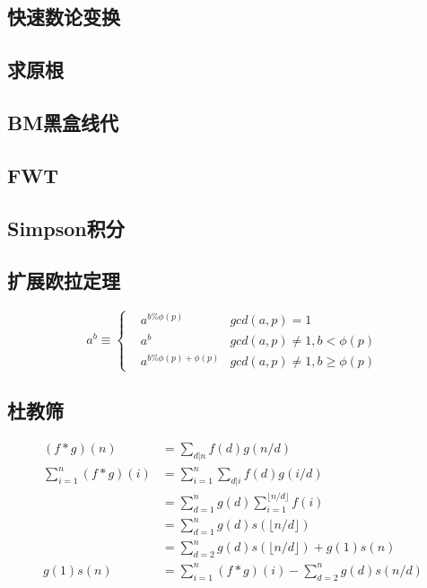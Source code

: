 \documentclass{ctexart}
\begin{document}
\subsection{快速数论变换}

\subsection{求原根}

\subsection{BM黑盒线代}

\subsection{FWT}

\subsection{Simpson积分}

\subsection{扩展欧拉定理}
\begin{equation}
a^b\equiv \left\{
\begin{aligned}
& a^{b\%\phi(p)}&  gcd(a,p)=1\\
& a^b           &  gcd(a,p)\neq1,b<\phi(p)\\
& a^{b\%\phi(p)+\phi(p)} & gcd(a,p)\neq1,b\geq\phi(p)
\end{aligned}
\right.
\end{equation}

\subsection{杜教筛}
\begin{align*}
	(f*g)(n)&=\sum_{d|n}f(d)g(n/d) \\
	\sum_{i=1}^n(f*g)(i) &= \sum_{i=1}^n\sum_{d|i}f(d)g(i/d) \\
	&= \sum_{d=1}^ng(d)\sum_{i=1}^{\lfloor n/d\rfloor}f(i) \\
	&= \sum_{d=1}^ng(d)s(\lfloor n/d \rfloor) \\
	&= \sum_{d=2}^ng(d)s(\lfloor n/d \rfloor)+g(1)s(n) \\
	g(1)s(n) &=\sum_{i=1}^n(f*g)(i)-\sum_{d=2}^ng(d)s(n/d)
\end{align*}

\end{document}
